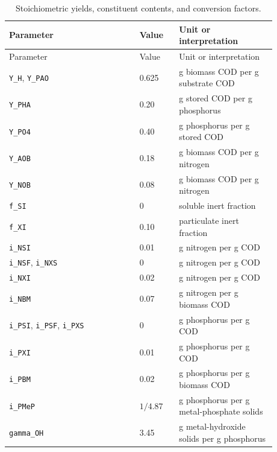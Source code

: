 \documentclass[a4paper,fleqn]{cas-sc}
\begin{document}
\begin{longtable}{p{0.43\linewidth}p{0.13\linewidth}p{0.32\linewidth}}
\caption{Stoichiometric yields, constituent contents, and conversion factors.}\label{tab:Sstoichiometry}\\
\toprule
Parameter & Value & Unit or interpretation\\
\midrule
\endfirsthead
\toprule
Parameter & Value & Unit or interpretation\\
\midrule
\endhead
\texttt{Y\_H}, \texttt{Y\_PAO} & 0.625 & g biomass COD per g substrate COD\\
\texttt{Y\_PHA} & 0.20 & g stored COD per g phosphorus\\
\texttt{Y\_PO4} & 0.40 & g phosphorus per g stored COD\\
\texttt{Y\_AOB} & 0.18 & g biomass COD per g nitrogen\\
\texttt{Y\_NOB} & 0.08 & g biomass COD per g nitrogen\\
\texttt{f\_SI} & 0 & soluble inert fraction\\
\texttt{f\_XI} & 0.10 & particulate inert fraction\\
\texttt{i\_NSI} & 0.01 & g nitrogen per g COD\\
\texttt{i\_NSF}, \texttt{i\_NXS} & 0 & g nitrogen per g COD\\
\texttt{i\_NXI} & 0.02 & g nitrogen per g COD\\
\texttt{i\_NBM} & 0.07 & g nitrogen per g biomass COD\\
\texttt{i\_PSI}, \texttt{i\_PSF}, \texttt{i\_PXS} & 0 & g phosphorus per g COD\\
\texttt{i\_PXI} & 0.01 & g phosphorus per g COD\\
\texttt{i\_PBM} & 0.02 & g phosphorus per g biomass COD\\
\texttt{i\_PMeP} & $1/4.87$ & g phosphorus per g metal-phosphate solids\\
\texttt{gamma\_OH} & 3.45 & g metal-hydroxide solids per g phosphorus\\
\bottomrule
\end{longtable}
\end{document}
